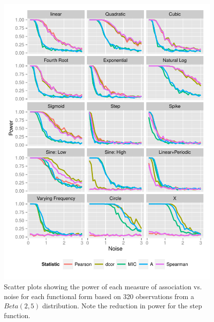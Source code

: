\documentclass[a4paper, 12pt]{report}
\begin{document}
\begin{figure}[H]
\begin{centering}
\includegraphics[width=\textwidth]{beta25Noise.pdf}
\caption{Scatter plots showing the power of each measure of association vs. noise for each functional form based on 320 observations from a $Beta(2,5)$ distribution. Note the reduction in power for the step function.} 
\label{F:powerNB}
\end{centering}
\end{figure}
\end{document}
